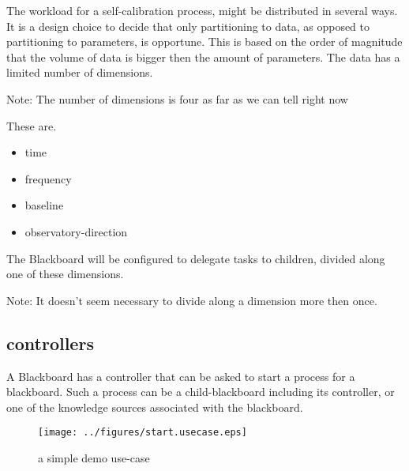 \documentclass[]{lofar}
\begin{document}
      The workload for a self-calibration process, might be
      distributed in several ways. It is a design choice to decide
      that only partitioning to data, as opposed to partitioning to
      parameters, is opportune. This is based on the order of
      magnitude that the volume of data is bigger then the amount of
      parameters. The data has a limited number of dimensions.
      \begin{em}\large{Note: }
        The number of dimensions is four as far as
        we can tell right now
      \end{em}

      These are.

      \begin{itemize}

        \item 

          time

	\item 

          frequency

	\item 

          baseline

	\item 

          observatory-direction

      \end{itemize}

      The Blackboard will be configured to delegate tasks to children,
      divided along one of these dimensions.
      \begin{em}\large{Note: }
        It doesn't seem
        necessary to divide along a dimension more then once.
      \end{em}

    \subsection{controllers}
    \label{id2721330}\hypertarget{id2721330}{}%

      A Blackboard has a controller that can be asked to start a
      process for a blackboard. Such a process can be a
      child-blackboard including its controller, or one of the
      knowledge sources associated with the blackboard.

      \begin{figure}
        \texttt{[image: ../figures/start.usecase.eps]}
        \hypertarget{figure-start.usecase}{}
        \caption{a simple demo use-case\label{figure-start.usecase}}
      \end{figure}
\end{document}
